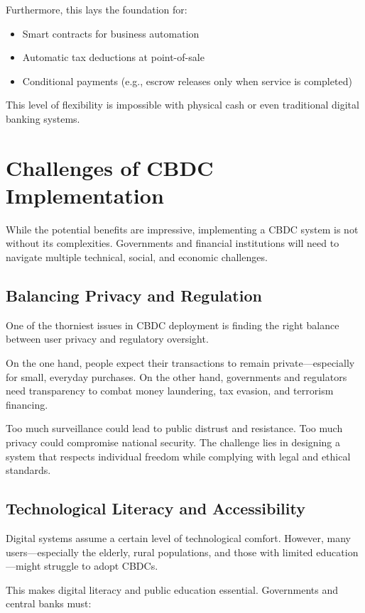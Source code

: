 Furthermore, this lays the foundation for:

\begin{itemize}
    \item Smart contracts for business automation
    \item Automatic tax deductions at point-of-sale
    \item Conditional payments (e.g., escrow releases only when service is completed)
\end{itemize}

This level of flexibility is impossible with physical cash or even traditional digital banking systems.

\section{Challenges of CBDC Implementation}
While the potential benefits are impressive, implementing a CBDC system is not without its complexities. Governments and financial institutions will need to navigate multiple technical, social, and economic challenges.

\subsection{Balancing Privacy and Regulation}
One of the thorniest issues in CBDC deployment is finding the right balance between user privacy and regulatory oversight.

On the one hand, people expect their transactions to remain private—especially for small, everyday purchases. On the other hand, governments and regulators need transparency to combat money laundering, tax evasion, and terrorism financing.

Too much surveillance could lead to public distrust and resistance. Too much privacy could compromise national security. The challenge lies in designing a system that respects individual freedom while complying with legal and ethical standards.

\subsection{Technological Literacy and Accessibility}
Digital systems assume a certain level of technological comfort. However, many users—especially the elderly, rural populations, and those with limited education—might struggle to adopt CBDCs.

This makes digital literacy and public education essential. Governments and central banks must:

